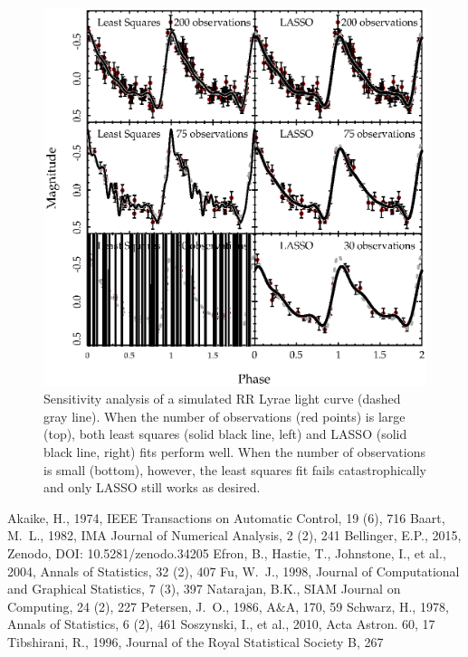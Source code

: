 \documentclass[11pt,twoside]{book}
\begin{document}
\begin{figure}[!ht]
    \centering
    \includegraphics[width=\textwidth,keepaspectratio]{bellinger-fig3.eps}
    \caption{Sensitivity analysis of a simulated RR Lyrae light curve (dashed gray line). When the number of observations (red points) is large (top), both least squares (solid black line, left) and LASSO (solid black line, right) fits perform well. When the number of observations is small (bottom), however, the least squares fit fails catastrophically and only LASSO still works as desired.} 
    \label{fig:sensitivity} 
\end{figure}
\begin{thebibliography}{}      
Akaike, H., 1974, IEEE Transactions on Automatic Control, 19 (6), 716
Baart, M.~L., 1982, IMA Journal of Numerical Analysis, 2 (2), 241
Bellinger, E.P., 2015, Zenodo, DOI: 10.5281/zenodo.34205
Efron, B., Hastie, T., Johnstone, I., et al., 2004, Annals of Statistics, 32 (2), 407
Fu, W.~J., 1998, Journal of Computational and Graphical Statistics, 7 (3), 397
 Natarajan, B.K., SIAM Journal on Computing, 24 (2), 227
Petersen, J.~O., 1986, A\&A, 170, 59
Schwarz, H., 1978, Annals of Statistics, 6 (2), 461
Soszynski, I., et al., 2010, Acta Astron. 60, 17
Tibshirani, R., 1996, Journal of the Royal Statistical Society B, 267
\end{thebibliography}
\end{document}
